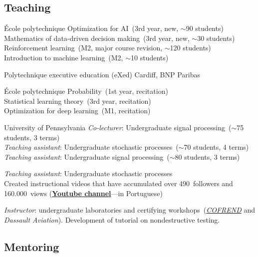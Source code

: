 \documentclass[highlights,publist]{cvlfoc}
\begin{document}
\bigskip
\subsection*{Teaching}

\begin{entrydate}
		{\'{E}cole polytechnique}
		{}
		{
		Optimization for AI~(3rd year, new, $\sim$90 students)\\
		Mathematics of data-driven decision making~(3rd year, new, $\sim$30 students)\\
		Reinforcement learning~(M2, major course revision, $\sim$120 students)\\
		Introduction to machine learning~(M2, $\sim$10 students)
		}

		{Polytechnique executive education (eXed)}
		{}
		{Cardiff, BNP Paribas}

		{\'{E}cole polytechnique}
		{}
		{
		Probability~(1st year, recitation)\\
		Statistical learning theory~(3rd year, recitation)\\
		Optimization for deep learning~(M1, recitation)
		}

		{University of Pennsylvania}
		{}
		{\emph{Co-lecturer}: Undergraduate signal processing~($\sim$75 students, 3 terms)
		\\
		\emph{Teaching assistant}: Undergraduate stochastic processes~($\sim$70 students, 4 terms)
		\\
		\emph{Teaching assistant}: Undergraduate signal processing~($\sim$80 students, 3 terms)}

		{}
		{\emph{Teaching assistant}: Undergraduate stochastic processes\\
		Created instructional videos that have accumulated over
		490~followers and\\160.000~views
		(\href{https://www.youtube.com/@videos-aleatorios}{\textbf{Youtube channel}}---in Portuguese)}

		{}
		{\emph{Instructor}: undergraduate laboratories and certifying workshops~(\href{https://www.cofrend.com}{\emph{COFREND}}
		and \emph{Dassault Aviation}). Development of tutorial on nondestructive
		testing.}
\end{entrydate}


\bigskip
\subsection*{Mentoring}
\end{document}
